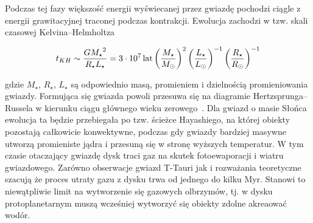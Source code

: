 Podczas tej fazy większość energii wyświecanej przez gwiazdę pochodzi ciągle z
energii grawitacyjnej traconej podczas kontrakcji. Ewolucja zachodzi w tzw.
skali czasowej Kelvina--Helmholtza 

\begin{equation} 
   t_{KH} \sim  \frac{G{M_{\star}}^2}{R_{\star}L_{\star}} = 3\cdot 10^7 \hbox{$\thinspace\textrm{lat}$}
   \left(\frac{M_\star}{M_\odot}\right)^{2}
   \left(\frac{L_\star}{L_\odot}\right)^{-1}
   \left(\frac{R_\star}{R_\odot}\right)^{-1}
\end{equation}

gdzie $M_{\star}$, $R_{\star}$, $L_{\star}$ są odpowiednio masą, promieniem i
dzielnością promieniowania gwiazdy. Formująca się gwiazda powoli przesuwa się na
diagramie Hertzsprunga--Russela w kierunku ciągu głównego wieku
zerowego~\cite{palla}.  Dla gwiazd o masie Słońca ewolucja ta będzie przebiegała
po tzw. ścieżce Hayashiego, na której obiekty pozostają całkowicie konwektywne,
podczas gdy gwiazdy bardziej masywne utworzą promieniste jądra i przesuną się
w stronę wyższych temperatur. W tym czasie otaczający gwiazdę dysk traci
gaz na skutek fotoewaporacji i wiatru gwiazdowego. Zarówno obserwacje gwiazd
T-Tauri jak i rozważania teoretyczne~\cite{AP12} szacują że proces utraty gazu
z dysku trwa od jednego do kilku Myr.  Stanowi to niewątpliwie limit na
wytworzenie się gazowych olbrzymów, tj. w dysku protoplanetarnym muszą
wcześniej wytworzyć się obiekty zdolne akreaować wodór.

